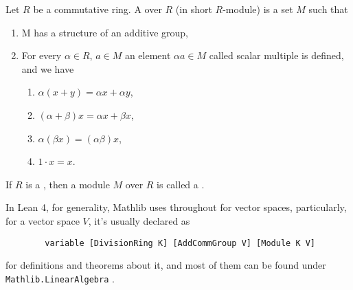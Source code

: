 \begin{definition}[Module]
    \label{module}
    \leanok

    Let $R$ be a commutative ring. A  over $R$ (in short $R$-module) is a set $M$ such that

    \begin{enumerate}
      \item M has a structure of an additive group,
    
      \item For every $\alpha \in R$, $a \in M$ an element $\alpha a \in M$ called scalar multiple is defined, and we have
      
        \begin{enumerate}[i]
            \item $\alpha(x+y)=\alpha x+\alpha y$,
            \item $(\alpha+\beta) x=\alpha x+\beta x$,
            \item $\alpha(\beta x)=(\alpha \beta) x$,
            \item $1 \cdot x=x$.
        \end{enumerate}
    \end{enumerate}

\end{definition}

\begin{definition}
    \label{vector_space}
    \leanok

    If $R$ is a , then a module $M$ over $R$ is called a .

\end{definition}

\begin{remark}
    \label{mk:vector_space}

    In Lean 4, for generality, Mathlib uses  throughout for vector spaces,
    particularly, for a vector space $V$, it's usually declared as

    \begin{lstlisting}
        variable [DivisionRing K] [AddCommGroup V] [Module K V]
    \end{lstlisting}

    for definitions and theorems about it, and most of them can be found under \texttt{Mathlib.LinearAlgebra} .
    
\end{remark}